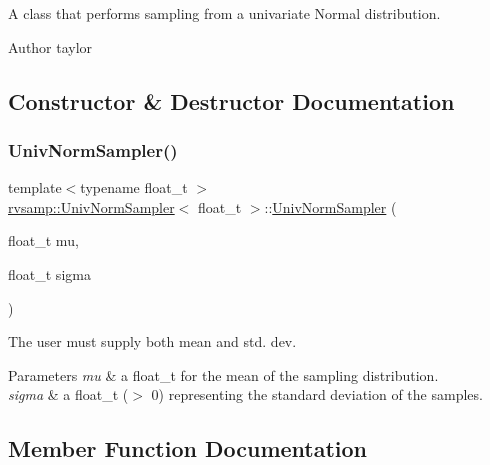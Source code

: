 A class that performs sampling from a univariate Normal distribution. 

\begin{DoxyAuthor}{Author}
taylor 
\end{DoxyAuthor}


\subsection{Constructor \& Destructor Documentation}
\mbox{\label{classrvsamp_1_1UnivNormSampler_a9a643fec11776028014be75163819807}} 
\subsubsection{\texorpdfstring{Univ\+Norm\+Sampler()}{UnivNormSampler()}}
{\footnotesize\ttfamily template$<$typename float\+\_\+t $>$ \\
\hyperlink{classrvsamp_1_1UnivNormSampler}{rvsamp\+::\+Univ\+Norm\+Sampler}$<$ float\+\_\+t $>$\+::\hyperlink{classrvsamp_1_1UnivNormSampler}{Univ\+Norm\+Sampler} (\begin{DoxyParamCaption}\item[{float\+\_\+t}]{mu,  }\item[{float\+\_\+t}]{sigma }\end{DoxyParamCaption})}



The user must supply both mean and std. dev. 


\begin{DoxyParams}{Parameters}
{\em mu} & a float\+\_\+t for the mean of the sampling distribution. \\
\hline
{\em sigma} & a float\+\_\+t ($>$ 0) representing the standard deviation of the samples. \\
\hline
\end{DoxyParams}


\subsection{Member Function Documentation}
\mbox{\label{classrvsamp_1_1UnivNormSampler_a67416efdbb1569a068d5a5a4914e27a1}} 
